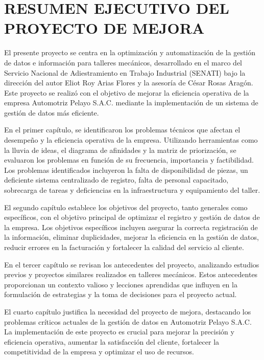 \section*{RESUMEN EJECUTIVO DEL PROYECTO DE MEJORA}

El presente proyecto se centra en la optimización y automatización de la gestión de datos e información para talleres mecánicos, desarrollado en el marco del Servicio Nacional de Adiestramiento en Trabajo Industrial (SENATI) bajo la dirección del autor Eliot Roy Arias Flores y la asesoría de César Rosas Aragón. Este proyecto se realizó con el objetivo de mejorar la eficiencia operativa de la empresa Automotriz Pelayo S.A.C. mediante la implementación de un sistema de gestión de datos más eficiente.

En el primer capítulo, se identificaron los problemas técnicos que afectan el desempeño y la eficiencia operativa de la empresa. Utilizando herramientas como la lluvia de ideas, el diagrama de afinidades y la matriz de priorización, se evaluaron los problemas en función de su frecuencia, importancia y factibilidad. Los problemas identificados incluyeron la falta de disponibilidad de piezas, un deficiente sistema centralizado de registro, falta de personal capacitado, sobrecarga de tareas y deficiencias en la infraestructura y equipamiento del taller.

El segundo capítulo establece los objetivos del proyecto, tanto generales como específicos, con el objetivo principal de optimizar el registro y gestión de datos de la empresa. Los objetivos específicos incluyen asegurar la correcta registración de la información, eliminar duplicidades, mejorar la eficiencia en la gestión de datos, reducir errores en la facturación y fortalecer la calidad del servicio al cliente.

En el tercer capítulo se revisan los antecedentes del proyecto, analizando estudios previos y proyectos similares realizados en talleres mecánicos. Estos antecedentes proporcionan un contexto valioso y lecciones aprendidas que influyen en la formulación de estrategias y la toma de decisiones para el proyecto actual.

El cuarto capítulo justifica la necesidad del proyecto de mejora, destacando los problemas críticos actuales de la gestión de datos en Automotriz Pelayo S.A.C. La implementación de este proyecto es crucial para mejorar la precisión y eficiencia operativa, aumentar la satisfacción del cliente, fortalecer la competitividad de la empresa y optimizar el uso de recursos.

